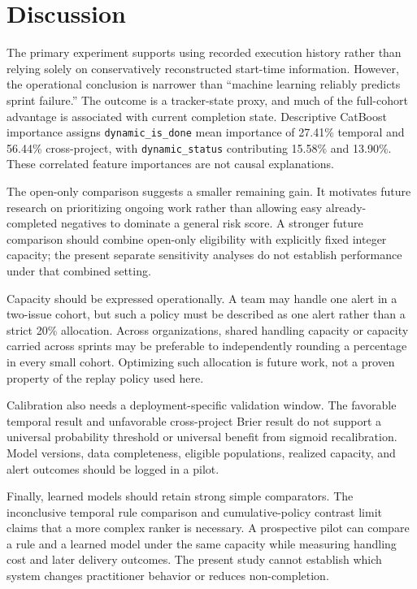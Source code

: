 \section{Discussion}\label{discussion}

The primary experiment supports using recorded execution history rather than relying solely on conservatively reconstructed start-time information. However, the operational conclusion is narrower than ``machine learning reliably predicts sprint failure.'' The outcome is a tracker-state proxy, and much of the full-cohort advantage is associated with current completion state. Descriptive CatBoost importance assigns \texttt{dynamic\_\allowbreak{}is\_\allowbreak{}done} mean importance of 27.41\% temporal and 56.44\% cross-project, with \texttt{dynamic\_\allowbreak{}status} contributing 15.58\% and 13.90\%. These correlated feature importances are not causal explanations.

The open-only comparison suggests a smaller remaining gain. It motivates future research on prioritizing ongoing work rather than allowing easy already-completed negatives to dominate a general risk score. A stronger future comparison should combine open-only eligibility with explicitly fixed integer capacity; the present separate sensitivity analyses do not establish performance under that combined setting.

Capacity should be expressed operationally. A team may handle one alert in a two-issue cohort, but such a policy must be described as one alert rather than a strict 20\% allocation. Across organizations, shared handling capacity or capacity carried across sprints may be preferable to independently rounding a percentage in every small cohort. Optimizing such allocation is future work, not a proven property of the replay policy used here.

Calibration also needs a deployment-specific validation window. The favorable temporal result and unfavorable cross-project Brier result do not support a universal probability threshold or universal benefit from sigmoid recalibration. Model versions, data completeness, eligible populations, realized capacity, and alert outcomes should be logged in a pilot.

Finally, learned models should retain strong simple comparators. The inconclusive temporal rule comparison and cumulative-policy contrast limit claims that a more complex ranker is necessary. A prospective pilot can compare a rule and a learned model under the same capacity while measuring handling cost and later delivery outcomes. The present study cannot establish which system changes practitioner behavior or reduces non-completion.
